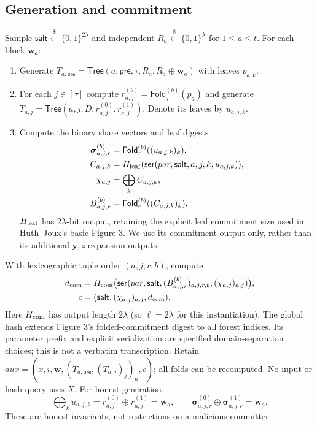 \documentclass[11pt]{article}
\theoremstyle{plain}
\theoremstyle{definition}
\theoremstyle{remark}
\newcommand{\bits}{\{0,1\}}
\newcommand{\getsr}{\mathrel{\overset{\$}{\leftarrow}}}
\newcommand{\Ser}{\mathsf{ser}}
\begin{document}
\subsection{Generation and commitment}
Sample $\mathsf{salt}\getsr\bits^{2\lambda}$ and independent
$R_a\getsr\bits^\lambda$ for $1\leq a\leq t$.
For each block $\mathbf w_a$:
\begin{enumerate}
\item Generate $T_{a,\mathsf{pre}}=\mathsf{Tree}
(a,\mathsf{pre},\tau,R_a,R_a\oplus\mathbf w_a)$ with leaves $p_{a,k}$.
\item For each $j\in[\tau]$ compute
$r_{a,j}^{(b)}=\mathsf{Fold}_{j}^{(b)}(p_a)$ and generate
$T_{a,j}=\mathsf{Tree}(a,j,D,r_{a,j}^{(0)},r_{a,j}^{(1)})$.
Denote its leaves by $u_{a,j,k}$.
\item Compute the binary share vectors and leaf digests
\begin{align}
 \boldsymbol\sigma_{a,j,r}^{(b)}
    &=\mathsf{Fold}_{r}^{(b)}((u_{a,j,k})_k),\label{eq:fold}\\
 C_{a,j,k}&=H_{\rm leaf}(\Ser(par,\mathsf{salt},a,j,k,u_{a,j,k})),\nonumber\\
 \chi_{a,j}&=\bigoplus_k C_{a,j,k},\nonumber\\
 B_{a,j,r}^{(b)}&=\mathsf{Fold}_{r}^{(b)}((C_{a,j,k})_k).\label{eq:hashfold}
\end{align}
$H_{\rm leaf}$ has $2\lambda$-bit output, retaining the explicit leaf
commitment size used in Huth--Joux's basic Figure 3. We use its commitment
output only, rather than its additional $\mathbf y,z$ expansion outputs.
\end{enumerate}
With lexicographic tuple order $(a,j,r,b)$, compute
\begin{align}
 d_{\rm com}&=H_{\rm com}\bigl(\Ser(par,\mathsf{salt},
             (B_{a,j,r}^{(b)})_{a,j,r,b},(\chi_{a,j})_{a,j})\bigr),\nonumber\\
 c&=(\mathsf{salt},(\chi_{a,j})_{a,j},d_{\rm com}).\label{eq:commitment}
\end{align}
Here $H_{\rm com}$ has output length $2\lambda$ (so $\ell=2\lambda$ for this
instantiation). The global hash extends Figure 3's folded-commitment digest
to all forest indices. Its parameter prefix and explicit serialization are
specified domain-separation choices; this is not a verbatim transcription.
Retain $aux=(x,i,\mathbf w,(T_{a,\mathsf{pre}},(T_{a,j})_j)_a,c)$;
all folds can be recomputed. No input or hash query uses $X$.
For honest generation,
\begin{equation}\label{eq:total}
 \bigoplus_k u_{a,j,k}=r_{a,j}^{(0)}\oplus r_{a,j}^{(1)}=\mathbf w_a,
 \qquad
 \boldsymbol\sigma_{a,j,r}^{(0)}\oplus
 \boldsymbol\sigma_{a,j,r}^{(1)}=\mathbf w_a.
\end{equation}
These are honest invariants, not restrictions on a malicious committer.
\end{document}
